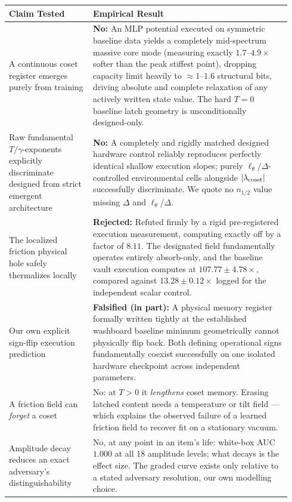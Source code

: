 \documentclass{article}
\begin{document}
\begin{center}
\begin{tabular}{p{0.28\linewidth}p{0.66\linewidth}}
\toprule
Claim Tested & Empirical Result\\
\midrule
A continuous coset register emerges purely from training & \textbf{No:} An MLP potential executed on symmetric baseline data yields a completely mid-spectrum massive core mode (measuring exactly $1.7$--$4.9\times$ softer than the peak stiffest point), dropping capacity limit heavily to $\approx1$--$1.6$ structural bits, driving absolute and complete relaxation of any actively written state value. The hard $T=0$ baseline latch geometry is unconditionally designed-only.\\
Raw fundamental $T/\gamma$-exponents explicitly discriminate designed from strict emergent architecture & \textbf{No:} A completely and rigidly matched designed hardware control reliably reproduces perfectly identical shallow execution slopes; purely $\ell_\theta/\Delta$-controlled environmental cells alongside $|\lambda_{\rm coset}|$ successfully discriminate. We quote no $n_{1/2}$ value missing $\Delta$ and $\ell_\theta/\Delta$.\\
The localized friction physical hole safely thermalizes locally & \textbf{Rejected:} Refuted firmly by a rigid pre-registered execution measurement, computing exactly off by a factor of $8.11$. The designated field fundamentally operates entirely absorb-only, and the baseline vault execution computes at $107.77\pm4.78\times$, compared against $13.28\pm0.12\times$ logged for the independent scalar control.\\
Our own explicit sign-flip execution prediction & \textbf{Falsified (in part):} A physical memory register formally written tightly at the established washboard baseline minimum geometrically cannot physically flip back. Both defining operational signs fundamentally coexist successfully on one isolated hardware checkpoint across independent parameters.\\
A friction field can \emph{forget} a coset & No: at $T>0$ it \emph{lengthens} coset memory. Erasing latched content needs a temperature or tilt field --- which explains the observed failure of a learned friction field to recover fit on a stationary vacuum.\\
Amplitude decay reduces an exact adversary's distinguishability & No, at any point in an item's life: white-box AUC $1.000$ at all 18 amplitude levels; what decays is the effect size. The graded curve exists only relative to a stated adversary resolution, our own modelling choice.\\

\end{tabular}
\end{center}
\end{document}
